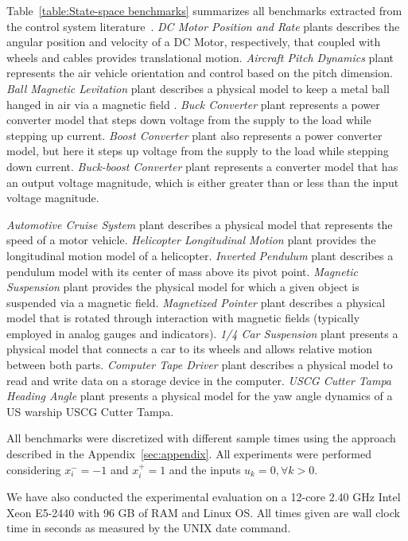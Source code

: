 \documentclass[runningheads,a4paper]{llncs}
\begin{document}
Table~\ref{table:State-space benchmarks} summarizes all benchmarks extracted 
from the control system literature~\cite{Franklin15,maglev,converters,CTMS}. 
\textit{DC Motor Position and Rate} plants describes the angular position and 
velocity of a DC Motor, respectively, that coupled with wheels and cables provides 
translational motion. 
\textit{Aircraft Pitch Dynamics} plant represents the air vehicle orientation and 
control based on the pitch dimension. 
\textit{Ball Magnetic Levitation} plant describes a physical model to keep a 
metal ball hanged in air via a magnetic field . 
\textit{Buck Converter} plant represents a power converter model that steps down 
voltage from the supply to the load while stepping up current. 
\textit{Boost Converter} plant also represents a power converter model, but here 
it steps up voltage from the supply to the load while stepping down current. 
\textit{Buck-boost Converter} plant represents a converter model that has an output 
voltage magnitude, which is either greater than or less than the input voltage magnitude. 

\textit{Automotive Cruise System} plant describes a physical model that represents 
the speed of a motor vehicle. 
\textit{Helicopter Longitudinal Motion} plant provides the 
longitudinal motion model of a helicopter. 
\textit{Inverted Pendulum} plant describes a pendulum model
with its center of mass above its pivot point. 
\textit{Magnetic Suspension} plant provides the physical model for which 
a given object is suspended via a magnetic field. 
\textit{Magnetized Pointer} plant describes a physical model that is rotated through interaction 
with magnetic fields (typically employed in analog gauges and indicators).
\textit{1/4 Car Suspension} plant presents a physical model that connects a car to its wheels 
and allows relative motion between both parts.
\textit{Computer Tape Driver} plant describes a physical model to read and write data 
on a storage device in the computer.
\textit{USCG Cutter Tampa Heading Angle} plant presents a physical model 
for the yaw angle dynamics of a US warship USCG Cutter Tampa.

All benchmarks were discretized with different sample times using 
the approach described in the Appendix~\ref{sec:appendix}. 
All experiments were performed considering $x_{i}^{-}=-1$ and 
$x_{i}^{+}=1$ and the inputs $u_{k}=0, \forall k>0$.

We have also conducted the experimental evaluation on a 12-core 2.40 GHz
Intel Xeon E5-2440 with 96 GB of RAM and Linux OS. All times given are wall 
clock time in seconds as measured by the UNIX date command. 
\end{document}
